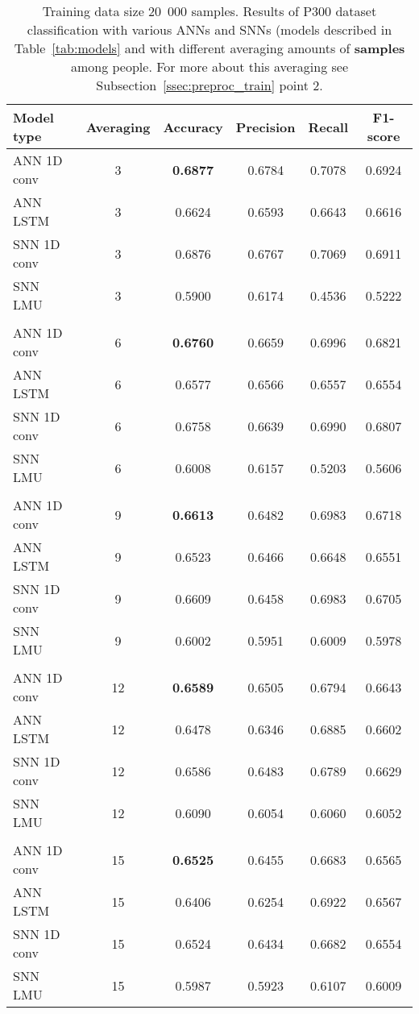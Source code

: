 
\begin{table}[ht!]
	\centering
	\begin{tabular}{l c c c c c}
		\hline
		Model type & Averaging & Accuracy & Precision & Recall & F1-score \\
		\hline
		ANN 1D conv & 3 & \textbf{0.6877} & 0.6784 & 0.7078 & 0.6924 \\
		ANN LSTM    & 3 & 0.6624 & 0.6593 & 0.6643 & 0.6616 \\
		SNN 1D conv & 3 & 0.6876 & 0.6767 & 0.7069 & 0.6911 \\
		SNN LMU     & 3 & 0.5900 & 0.6174 & 0.4536 & 0.5222 \\
		\\
		ANN 1D conv & 6 & \textbf{0.6760} & 0.6659 & 0.6996 & 0.6821 \\
		ANN LSTM    & 6 & 0.6577 & 0.6566 & 0.6557 & 0.6554 \\
		SNN 1D conv & 6 & 0.6758 & 0.6639 & 0.6990 & 0.6807 \\
		SNN LMU     & 6 & 0.6008 & 0.6157 & 0.5203 & 0.5606 \\
		\\
		ANN 1D conv & 9 & \textbf{0.6613} & 0.6482 & 0.6983 & 0.6718 \\
		ANN LSTM    & 9 & 0.6523 & 0.6466 & 0.6648 & 0.6551 \\
		SNN 1D conv & 9 & 0.6609 & 0.6458 & 0.6983 & 0.6705 \\
		SNN LMU     & 9 & 0.6002 & 0.5951 & 0.6009 & 0.5978 \\
		\\
		ANN 1D conv & 12 & \textbf{0.6589} & 0.6505 & 0.6794 & 0.6643 \\
		ANN LSTM    & 12 & 0.6478 & 0.6346 & 0.6885 & 0.6602 \\
		SNN 1D conv & 12 & 0.6586 & 0.6483 & 0.6789 & 0.6629 \\
		SNN LMU     & 12 & 0.6090 & 0.6054 & 0.6060 & 0.6052 \\
		\\
		ANN 1D conv & 15 & \textbf{0.6525} & 0.6455 & 0.6683 & 0.6565 \\
		ANN LSTM    & 15 & 0.6406 & 0.6254 & 0.6922 & 0.6567 \\
		SNN 1D conv & 15 & 0.6524 & 0.6434 & 0.6682 & 0.6554 \\
		SNN LMU     & 15 & 0.5987 & 0.5923 & 0.6107 & 0.6009 \\
		\hline
	\end{tabular}
	\caption{Training data size 20~000 samples. Results of P300 dataset classification with various ANNs and SNNs (models described in Table~\ref{tab:models} and with different averaging amounts of \textbf{samples} among people. For more about this averaging see Subsection~\ref{ssec:preproc_train} point 2.}
	\label{tab:results_samples_20000}
\end{table}
